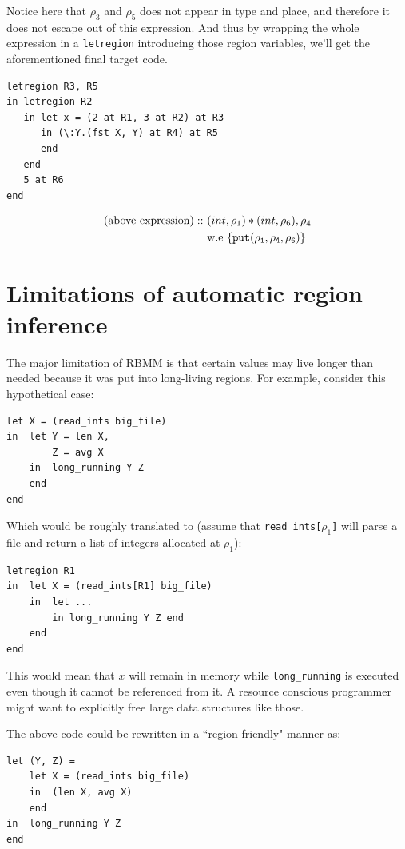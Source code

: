 \documentclass[11pt]{report}
\begin{document}
\begin{enumerate}
Notice here that $\rho_3$ and $\rho_5$ does not appear in type and place, and therefore it does not escape out of this expression. And thus by wrapping the whole expression in a \texttt{letregion} introducing those region variables, we’ll get the aforementioned final target code.

\begin{lstlisting}
letregion R3, R5
in letregion R2
   in let x = (2 at R1, 3 at R2) at R3
      in (\:Y.(fst X, Y) at R4) at R5
      end
   end
   5 at R6
end
\end{lstlisting}
\begin{align*}
{\rm (above~expression)} ::&~ (int, \rho_1)*(int, \rho_6), \rho_4
\\
& \rm ~w.e~ \tt \{put(\rho_1, \rho_4, \rho_6)\}
\end{align*}

\end{enumerate}

\section*{Limitations of automatic region inference}

The major limitation of RBMM is that certain values may live longer than needed because it was put into long-living regions. For example, consider this hypothetical case:

\begin{lstlisting}
let X = (read_ints big_file)
in  let Y = len X,
        Z = avg X
    in  long_running Y Z
    end
end
\end{lstlisting}

\noindent Which would be roughly translated to (assume that \texttt{read\_ints[$\rho_1$]} will parse a file and return a list of integers allocated at $\rho_1$):

\begin{lstlisting}
letregion R1
in  let X = (read_ints[R1] big_file)
    in  let ...
        in long_running Y Z end
    end
end
\end{lstlisting}

This would mean that $x$ will remain in memory while \texttt{long\_running} is executed even though it cannot be referenced from it. A resource conscious programmer might want to explicitly free large data structures like those.

The above code could be rewritten in a ``region-friendly" manner as:

\begin{lstlisting}
let (Y, Z) =
    let X = (read_ints big_file)
    in  (len X, avg X)
    end
in  long_running Y Z
end
\end{lstlisting}
\end{document}
